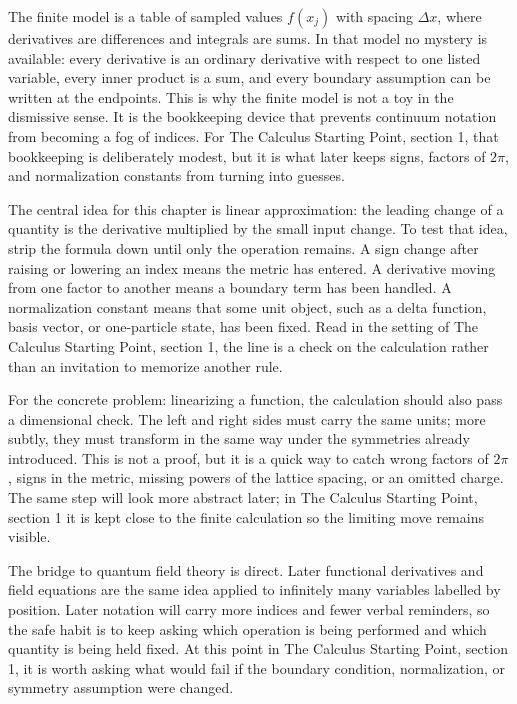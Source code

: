 The finite model is a table of sampled values \(f(x_j)\) with spacing \(\Delta x\), where derivatives are differences and integrals are sums.  In that model no mystery is available: every derivative is an ordinary derivative with respect to one listed variable, every inner product is a sum, and every boundary assumption can be written at the endpoints.  This is why the finite model is not a toy in the dismissive sense.  It is the bookkeeping device that prevents continuum notation from becoming a fog of indices.  For The Calculus Starting Point, section 1, that bookkeeping is deliberately modest, but it is what later keeps signs, factors of \(2\pi\), and normalization constants from turning into guesses.

The central idea for this chapter is linear approximation: the leading change of a quantity is the derivative multiplied by the small input change.  To test that idea, strip the formula down until only the operation remains.  A sign change after raising or lowering an index means the metric has entered.  A derivative moving from one factor to another means a boundary term has been handled.  A normalization constant means that some unit object, such as a delta function, basis vector, or one-particle state, has been fixed.  Read in the setting of The Calculus Starting Point, section 1, the line is a check on the calculation rather than an invitation to memorize another rule.

For the concrete problem: linearizing a function, the calculation should also pass a dimensional check.  The left and right sides must carry the same units; more subtly, they must transform in the same way under the symmetries already introduced.  This is not a proof, but it is a quick way to catch wrong factors of \(2\pi\), signs in the metric, missing powers of the lattice spacing, or an omitted charge.  The same step will look more abstract later; in The Calculus Starting Point, section 1 it is kept close to the finite calculation so the limiting move remains visible.

The bridge to quantum field theory is direct.  Later functional derivatives and field equations are the same idea applied to infinitely many variables labelled by position.  Later notation will carry more indices and fewer verbal reminders, so the safe habit is to keep asking which operation is being performed and which quantity is being held fixed.  At this point in The Calculus Starting Point, section 1, it is worth asking what would fail if the boundary condition, normalization, or symmetry assumption were changed.

